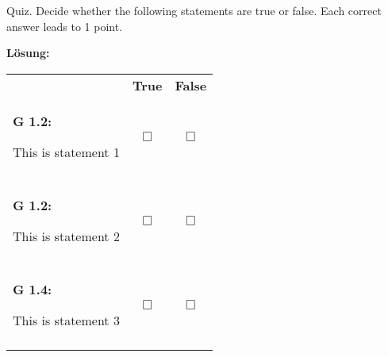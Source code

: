 \newpage
\begin{aufgabe}{10}{0}{0}{0}{0}{0}{0}{0}
\vspace{0.2cm}

 Quiz. Decide whether the following statements are true or false. Each correct answer leads to 1 point. \\
\begin{loesung}
\textbf{Lösung:}
\end{loesung}

  \begin{tabular}{p{30em} c c} 
  
                                                                                                                 & \textbf{True} & \textbf{False} \\ 
                        
\begin{lernziel}\textbf{G 1.2:}\end{lernziel}
This is statement 1  & 
 \begin{loesung}\rlap{\xmark}\end{loesung}$\Box$    &$\Box$    \\                                                                                                               
& & \\

\begin{lernziel}\textbf{G 1.2:}\end{lernziel}
This is statement 2 & 
$\Box$    & \begin{loesung}\rlap{\xmark}\end{loesung}$\Box$    \\                                                                                                               
& & \\

\begin{lernziel}\textbf{G 1.4:}\end{lernziel}
This is statement 3  & 
 \begin{loesung}\rlap{\xmark}\end{loesung}$\Box$    &$\Box$    \\                                                                                                               
& & \\

                    
\end{tabular}
\end{aufgabe}




